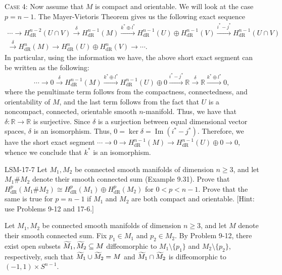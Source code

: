 \documentclass{article}
\begin{document}
	\textsc{Case 4:} Now assume that $M$ is compact and orientable. We will look at the case $p = n - 1$. The Mayer-Vietoris Theorem gives us the following exact sequence 
	\begin{multline*}
		\dotsm \to H^{n-2}_{\text{dR}}(U \cap V) \xrightarrow{\delta} H^{n-1}_{\text{dR}}(M) \xrightarrow{k^{\ast} \oplus l^{\ast}} H^{n-1}_{\text{dR}}(U) \oplus H^{n-1}_{\text{dR}}(V) \xrightarrow{i^{\ast} - j^{\ast}} H^{n-1}_{\text{dR}}(U \cap V) \\ \xrightarrow{\delta} H^{n}_{\text{dR}}(M) \to H^{n}_{\text{dR}}(U) \oplus H^{n}_{\text{dR}}(V) \to\dotsm. 
	\end{multline*}
	In particular, using the information we have, the above short exact segment can be written as the following: 
	\begin{equation*}
		\dotsm \to 0 \xrightarrow{\delta} H^{n-1}_{\text{dR}}(M) \xrightarrow{k^{\ast}\oplus l^{\ast}} H^{n-1}_{\text{dR}}(U) \oplus 0 \xrightarrow{i^{\ast} - j^{\ast}} \mathbb{R} \xrightarrow{\delta} \mathbb{R} \xrightarrow{k^{\ast} \oplus l^{\ast}} 0, 
	\end{equation*}
	where the penultimate term follows from the compactness, connectedness, and orientability of $M$, and the last term follows from the fact that $U$ is a noncompact, connected, orientable smooth $n$-manifold. Thus, we have that $\delta: \mathbb{R}\to \mathbb{R}$ is surjective. Since $\delta$ is a surjection between equal dimensional vector spaces, $\delta$ is an isomorphism. Thus, $0 = \ker{\delta} = \operatorname{Im}(i^{\ast} - j^{\ast})$. Therefore, we have the short exact segment $\dotsm \to 0 \to H^{n-1}_{\text{dR}}(M) \to H^{n-1}_{\text{dR}}(U) \oplus 0 \to 0$, whence we conclude that $k^{\ast}$ is an isomorphism. 
	
	\begin{prb}{LSM-17-7}
		Let $M_{1}, M_{2}$ be connected smooth manifolds of dimension $n \geq 3$, and let $M_{1} \# M_{2}$ denote their smooth connected sum (Example 9.31). Prove that $H^{p}_{\text{dR}}(M_{1} \# M_{2}) \cong H^{p}_{\text{dR}}(M_{1}) \oplus H^{p}_{\text{dR}}(M_{2})$ for $0 < p < n - 1$. Prove that the same is true for $p = n - 1$ if $M_{1}$ and $M_{2}$ are both compact and orientable. [Hint: use Problems 9-12 and 17-6.]
	\end{prb}
	Let $M_{1}, M_{2}$ be connected smooth manifolds of dimension $n \geq 3$, and let $M$ denote their smooth connected sum. Fix $p_{1} \in M_{1}$ and $p_{2} \in M_{2}$. By Problem 9-12, there exist open subsets $\widetilde{M}_{1}, \widetilde{M}_{2} \subseteq M$  diffeomorphic to $M_{1} \setminus \{p_{1}\}$ and $M_{2}\setminus \{p_{2}\}$, respectively, such that $\widetilde{M}_{1} \cup \widetilde{M}_{2} = M$ and $\widetilde{M}_{1} \cap \widetilde{M}_{2}$ is diffeomorphic to $(-1,1) \times S^{n-1}$. 
	
\end{document}
